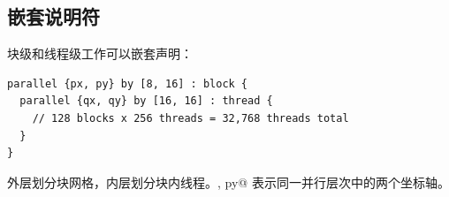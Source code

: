 \subsection*{嵌套说明符}

块级和线程级工作可以嵌套声明：

\begin{lstlisting}[language=croqtile,caption={嵌套说明符}]
parallel {px, py} by [8, 16] : block {
  parallel {qx, qy} by [16, 16] : thread {
    // 128 blocks x 256 threads = 32,768 threads total
  }
}
\end{lstlisting}

外层划分块网格，内层划分块内线程。\co@px, py@ 表示同一并行层次中的两个坐标轴。
